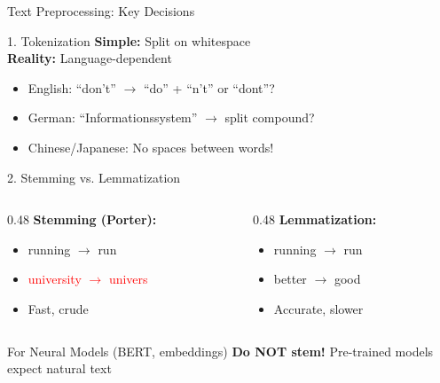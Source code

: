\documentclass[aspectratio=169]{beamer}
\newif\ifanimated
\newcommand{\cpause}{\ifanimated\pause\fi}
\begin{document}
\begin{frame}[shrink=25]{Text Preprocessing: Key Decisions}
\begin{block}{1. Tokenization}
\textbf{Simple:} Split on whitespace \\
\textbf{Reality:} Language-dependent
\begin{itemize}
    \item English: ``don't'' $\rightarrow$ ``do'' + ``n't'' or ``dont''?
    \item German: ``Informationssystem'' $\rightarrow$ split compound?
    \item Chinese/Japanese: No spaces between words!
\end{itemize}
\end{block}
\cpause

\begin{block}{2. Stemming vs. Lemmatization}
\begin{columns}
\begin{column}{0.48\textwidth}
\textbf{Stemming (Porter):}
\begin{itemize}
    \item running $\rightarrow$ run
    \item \textcolor{red}{university $\rightarrow$ univers}
    \item Fast, crude
\end{itemize}
\end{column}
\begin{column}{0.48\textwidth}
\textbf{Lemmatization:}
\begin{itemize}
    \item running $\rightarrow$ run
    \item better $\rightarrow$ good
    \item Accurate, slower
\end{itemize}
\end{column}
\end{columns}
\end{block}
\cpause

\begin{alertblock}{For Neural Models (BERT, embeddings)}
\textbf{Do NOT stem!} Pre-trained models expect natural text
\end{alertblock}
\cpause
\end{frame}
\end{document}
